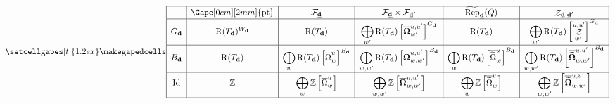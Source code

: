 \documentclass[border={7pt 0pt 130pt 0pt},varwidth]{standalone}
\DeclareMathOperator{\Id}{\operatorname{Id}}
\DeclareMathOperator{\RRep}{\widetilde{\operatorname{Rep}}}
\DeclareMathOperator{\pt}{\operatorname{pt}}
\DeclareMathOperator{\Rpt}{\operatorname{R}}
\DeclareMathOperator{\St}{\mathcal{Z}}
\newcommand{\dimvec}[1]{\mathbf{#1}}
\newcommand{\ftdimvec}[1]{\underline{\dimvec{#1}}}
\newcommand{\Wd}{W_{\dimvec{d}}}
\newcommand{\Omcell}{\Omega}
\newcommand{\OOmcell}{\boldsymbol{\Omega}}
\newcommand{\preimage}[1]{\widetilde{#1}}
\begin{document}
\begin{table}[]
\[
 \setcellgapes[t]{1.2ex}\makegapedcells
\centering
\begin{array}{|c|c|c|c|c|c|}
\hline
      & \Gape[0cm][2mm]{\pt}         & \mathcal{F}_{\ftdimvec{d}}                                                    & \mathcal{F}_{\ftdimvec{d}} \times \mathcal{F}_{\ftdimvec{d}'}                &\RRep_{\ftdimvec{d}}(Q)&   \St_{\ftdimvec{d},\ftdimvec{d}'}                      \\
       \hline
G_{\dimvec{d}} & \Rpt(T_{\dimvec{d}})^{\Wd} & \Rpt(T_{\dimvec{d}})                                                        & \displaystyle\bigoplus_{w'} \Rpt(T_{\dimvec{d}})  \left[ \overline{\OOmcell}_{w'}^{u,u'} \right]^{G_{\dimvec{d}}}
& \Rpt(T_{\dimvec{d}})                                                        & \displaystyle\bigoplus_{w'} \Rpt(T_{\dimvec{d}})  \left[ \St_{w'}^{u,u'} \right]^{G_{\dimvec{d}}} \\ \hline
{B_{\dimvec{d}}}     & \Rpt(T_{\dimvec{d}})     & \displaystyle\bigoplus_{w} \Rpt(T_{\dimvec{d}}) \left[ \overline{\Omcell}_{w}^{u} \right]^{B_{\dimvec{d}}}  & \displaystyle\bigoplus_{w,w'} \Rpt(T_{\dimvec{d}}) \left[ \overline{\OOmcell}_{w,w'}^{u,u'} \right]^{B_{\dimvec{d}}}
& \displaystyle\bigoplus_{w} \Rpt(T_{\dimvec{d}}) \left[ \overline{\preimage{\Omcell}}_{w}^{u} \right]^{B_{\dimvec{d}}}  & \displaystyle\bigoplus_{w,w'} \Rpt(T_{\dimvec{d}}) \left[ \overline{\preimage{\OOmcell}}_{w,w'}^{u,u'} \right]^{B_{\dimvec{d}}}    \\ \hline
\Id   & \mathbb{Z}  & \displaystyle\bigoplus_{w} \mathbb{Z} \left[ \overline{\Omcell}_{w}^{u} \right] & \displaystyle\bigoplus_{w,w'} \mathbb{Z} \left[ \overline{\OOmcell}_{w,w'}^{u,u'} \right]
& \displaystyle\bigoplus_{w} \mathbb{Z} \left[ \overline{\preimage{\Omcell}}_{w}^{u} \right] & \displaystyle\bigoplus_{w,w'} \mathbb{Z} \left[ \overline{\preimage{\OOmcell}}_{w,w'}^{u,u'} \right]   \\ \hline
\end{array}
\]
\end{table}
\end{document}
